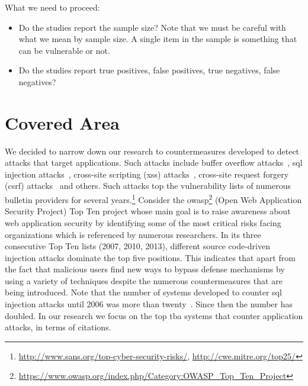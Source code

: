 \documentclass[conference]{IEEEtran}
\begin{document}
What we need to proceed:
\begin{itemize}
\item Do the studies report the sample size? Note that we must be
  careful with what we mean by sample size. A single item in the
  sample is something that can be vulnerable or not. 
\item Do the studies report true positives, false positives, true
  negatives, false negatives?
\end{itemize}


\section{Covered Area}

We decided to narrow down our
research to countermeasures developed to
detect attacks that target applications. Such attacks include
buffer overflow attacks~\cite{K11}, {\sc sql} injection
attacks~\cite{RL12b}, cross-site scripting ({\sc xss})
attacks~\cite{SG07}, cross-site request forgery ({\sc csrf})
attacks~\cite{LZRL09} and others.
Such attacks top the vulnerability lists of numerous bulletin providers for several
years.\footnote{\url{http://www.sans.org/top-cyber-security-risks/}, \url{http://cwe.mitre.org/top25/}}
Consider the {\sc owasp}\footnote{\url{https://www.owasp.org/index.php/Category:OWASP_Top_Ten_Project}}
(Open Web Application Security Project)
Top Ten project whose main goal is to raise awareness about
web application security by identifying some of the most critical risks facing
organizations which is referenced by numerous researchers.
In its three consecutive Top Ten lists (2007, 2010, 2013), different
source code-driven injection attacks dominate the top five positions.
This indicates that
apart from the fact that malicious users find new ways to bypass
defense mechanisms by using a variety of techniques despite the numerous
countermeasures that are being introduced.
Note that the number of systems developed to counter {\sc sql}
injection attacks until 2006 was more than twenty~\cite{HVO06}.
Since then the number has doubled.
In our research we focus on the top {\sc tba} systems that counter
application attacks, in terms of citations.
\end{document}
